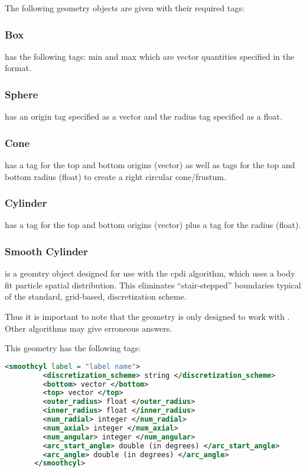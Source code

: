 The following geometry objects are given with their required tags:

\subsubsection{Box}
 has the following tags: min and max which are
vector quantities specified in the \Textsfc{[a, b, c]} format.

\subsubsection{Sphere}
 has an origin tag specified as a vector and the
radius tag specified as a float.

\subsubsection{Cone}
 has a tag for the top and bottom origins (vector)
as well as tags for the top and bottom radius (float) to create a
right circular cone/frustum.

\subsubsection{Cylinder}
 has a tag for the top and bottom origins
(vector) plus a tag for the radius (float).

\subsubsection{Smooth Cylinder}
 is a geomtry object designed for use with
the cpdi algorithm, which uses a body fit particle spatial
distribution.  This eliminates ``stair-stepped'' boundaries typical of
the standard, grid-based, discretization scheme.  
\begin{NoteBox}
Thus it is
  important to note that the  geometry is only designed to work with
  . Other
  algorithms may give erroneous answers.
\end{NoteBox}

This geometry has the following tags:

\begin{lstlisting}[language=XML]
	   <smoothcyl label = "label name">
	     <discretization_scheme> string </discretization_scheme>
	     <bottom> vector </bottom>
	     <top> vector </top>
	     <outer_radius> float </outer_radius>
	     <inner_radius> float </inner_radius>
	     <num_radial> integer </num_radial>
	     <num_axial> integer </num_axial>
	     <num_angular> integer </num_angular>
	     <arc_start_angle> double (in degrees) </arc_start_angle>
	     <arc_angle> double (in degrees) </arc_angle>
	   </smoothcyl>
\end{lstlisting}

